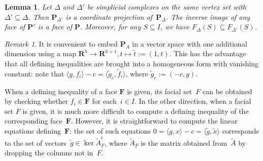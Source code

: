 \documentclass[aos,noinfoline]{imsart}
\newcommand{\face}{F}
\def\R{{\mathbf R}}
\def\<{\langle}
\def\>{\rangle}
\newcommand{\Fbf}{\mathbf{F}}
\newcommand{\Pbf}{\mathbf{P}}
\newtheorem{lemma}[theorem]{Lemma}
\theoremstyle{remark}
\newtheorem{remark}[theorem]{Remark} %
\theoremstyle{definition}
\newcommand{\he}[1]{\textcolor{red}{{H: #1}}}
\begin{document}
\begin{lemma}
  \label{lem:sub-complex}
  Let $\Delta$ and $\Delta'$ be simplicial complexes on the same vertex set with $\Delta'\subseteq\Delta$.
  Then $\Pbf_{\Delta'}$ is a coordinate projection of~$\Pbf_{\Delta}$.  The inverse image of any face of $\Pbf'$ is a face of $\Pbf$. Moreover, for any $S\subseteq I$, we have
  $\face_\Delta(S)\subseteq\face_{\Delta'}(S)$.
\end{lemma}

\begin{remark}
  \label{homog}
  It is convenient to embed $\Pbf_{A}$ in a vector space with one additional dimension using a map
  $\R^{h}\to\R^{h+1}, t\mapsto\tilde t:=(1,t)$.  This has the advantage that all defining inequalities are brought
  into a homogeneous form with vanishing constant: note that
  $\langle g, f_{i}\rangle - c = \langle \tilde g_{c}, \tilde f_{i}\rangle$, where $\tilde g_{c} := (-c,g)$.

  When a defining inequality of a face $\Fbf$ is given, its facial set~$F$ can be obtained by checking whether
  $f_{i}\in\Fbf$ for each~$i\in I$.  In the other direction, when a facial set $F$ is given, it is much more difficult
  to compute a defining inequality of the corresponding face~$\Fbf$.  However, it is straightforward to compute the
  linear equations defining~$\Fbf$: the set of such equations $0 = \<g,x\> - c = \<\tilde g,\tilde x\>$ corresponds to
  the set of vectors~$\tilde g\in\ker\tilde A_{F}^{t}$, where $\tilde A_{F}$ is the matrix obtained from~$\tilde A$ by
  dropping the columns not in~$F$.
\end{remark}
\end{document}

